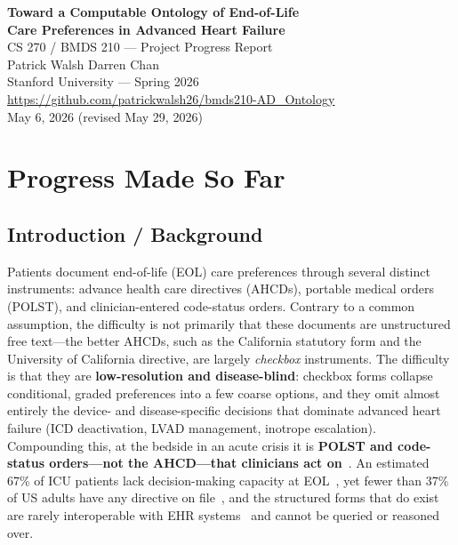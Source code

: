 \documentclass[11pt]{article}
\date{}
\begin{document}
\begin{center}
{\LARGE\bfseries Toward a Computable Ontology of End-of-Life\\Care Preferences in Advanced Heart Failure}\\[1em]
{\large CS 270 / BMDS 210 --- Project Progress Report}\\[1.5em]
{\large Patrick Walsh \quad Darren Chan}\\[0.5em]
Stanford University --- Spring 2026\\[0.3em]
\url{https://github.com/patrickwalsh26/bmds210-AD_Ontology}\\[0.3em]
May 6, 2026 \quad (revised May 29, 2026)
\end{center}
\vspace{1.5em}

\section{Progress Made So Far}

\subsection{Introduction / Background}

Patients document end-of-life (EOL) care preferences through several distinct instruments: advance health care directives (AHCDs), portable medical orders (POLST), and clinician-entered code-status orders. Contrary to a common assumption, the difficulty is not primarily that these documents are unstructured free text---the better AHCDs, such as the California statutory form and the University of California directive, are largely \emph{checkbox} instruments. The difficulty is that they are \textbf{low-resolution and disease-blind}: checkbox forms collapse conditional, graded preferences into a few coarse options, and they omit almost entirely the device- and disease-specific decisions that dominate advanced heart failure (ICD deactivation, LVAD management, inotrope escalation). Compounding this, at the bedside in an acute crisis it is \textbf{POLST and code-status orders---not the AHCD---that clinicians act on}~\cite{polst}. An estimated 67\% of ICU patients lack decision-making capacity at EOL~\cite{silveira2010}, yet fewer than 37\% of US adults have any directive on file~\cite{yadav2017}, and the structured forms that do exist are rarely interoperable with EHR systems~\cite{hl7adi2024} and cannot be queried or reasoned over.
\end{document}
